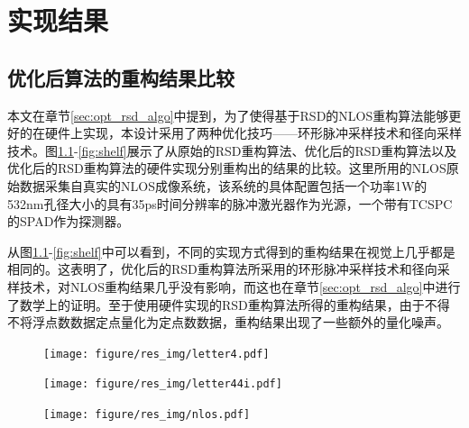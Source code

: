 \documentclass[master]{shtthesis}             %
\begin{document}
\chapter{实现结果}
\section{优化后算法的重构结果比较}\label{sec:recons_res_comp}

本文在章节\ref{sec:opt_rsd_algo}中提到，为了使得基于RSD的NLOS重构算法能够更好的在硬件上实现，本设计采用了两种优化技巧——环形脉冲采样技术和径向采样技术。图\ref{fig:letter4}-\ref{fig:shelf}展示了从原始的RSD重构算法、优化后的RSD重构算法以及优化后的RSD重构算法的硬件实现分别重构出的结果的比较。这里所用的NLOS原始数据采集自真实的NLOS成像系统\citep{Liu}，该系统的具体配置包括一个功率1W的532nm孔径大小的具有35ps时间分辨率的脉冲激光器作为光源，一个带有TCSPC的SPAD作为探测器。

从图\ref{fig:letter4}-\ref{fig:shelf}中可以看到，不同的实现方式得到的重构结果在视觉上几乎都是相同的。这表明了，优化后的RSD重构算法所采用的环形脉冲采样技术和径向采样技术，对NLOS重构结果几乎没有影响，而这也在章节\ref{sec:opt_rsd_algo}中进行了数学上的证明。至于使用硬件实现的RSD重构算法所得的重构结果，由于不得不将浮点数数据定点量化为定点数数据，重构结果出现了一些额外的量化噪声。
\begin{figure}[htbp]
  \centering
  \texttt{[image: figure/res\_img/letter4.pdf]}
  \label{fig:letter4}
\end{figure}

\begin{figure}[htbp]
  \centering
  \texttt{[image: figure/res\_img/letter44i.pdf]}
  \label{fig:letter44i}
\end{figure}

\begin{figure}[htbp]
  \centering
  \texttt{[image: figure/res\_img/nlos.pdf]}
  \label{fig:nlos}
\end{figure}
\end{document}
